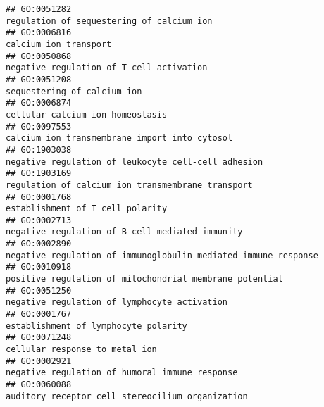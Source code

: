 \documentclass[
]{article}
\begin{document}
\begin{verbatim}
## GO:0051282                                                                                                        regulation of sequestering of calcium ion
## GO:0006816                                                                                                                            calcium ion transport
## GO:0050868                                                                                                         negative regulation of T cell activation
## GO:0051208                                                                                                                      sequestering of calcium ion
## GO:0006874                                                                                                                 cellular calcium ion homeostasis
## GO:0097553                                                                                                    calcium ion transmembrane import into cytosol
## GO:1903038                                                                                              negative regulation of leukocyte cell-cell adhesion
## GO:1903169                                                                                                regulation of calcium ion transmembrane transport
## GO:0001768                                                                                                                 establishment of T cell polarity
## GO:0002713                                                                                                  negative regulation of B cell mediated immunity
## GO:0002890                                                                                   negative regulation of immunoglobulin mediated immune response
## GO:0010918                                                                                          positive regulation of mitochondrial membrane potential
## GO:0051250                                                                                                     negative regulation of lymphocyte activation
## GO:0001767                                                                                                             establishment of lymphocyte polarity
## GO:0071248                                                                                                                   cellular response to metal ion
## GO:0002921                                                                                                   negative regulation of humoral immune response
## GO:0060088                                                                                                 auditory receptor cell stereocilium organization

\end{verbatim}
\end{document}
